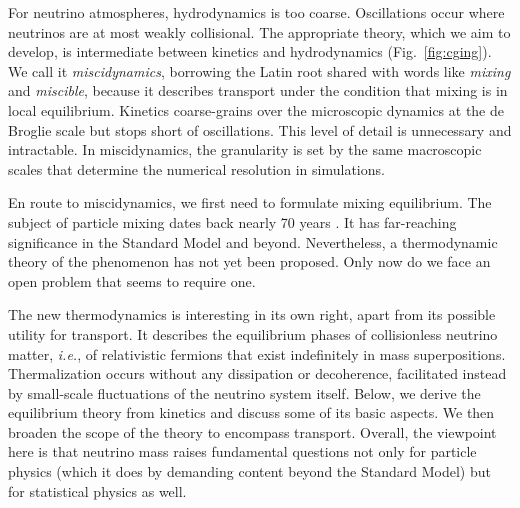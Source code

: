 \documentclass[aps,prl,twocolumn,groupedaddress]{revtex4-2}
\begin{document}
For neutrino atmospheres, hydrodynamics is too coarse. Oscillations occur where neutrinos are at most weakly collisional. The appropriate theory, which we aim to develop, is intermediate between kinetics and hydrodynamics (Fig.~\ref{fig:cging}). We call it \textit{miscidynamics}, borrowing the Latin root shared with words like \textit{mixing} and \textit{miscible}, because it describes transport under the condition that mixing is in local equilibrium. Kinetics coarse-grains over the microscopic dynamics at the de Broglie scale but stops short of oscillations. This level of detail is unnecessary and intractable. In miscidynamics, the granularity is set by the same macroscopic scales that determine the numerical resolution in simulations.

En route to miscidynamics, we first need to formulate mixing equilibrium. The subject of particle mixing dates back nearly 70 years \cite{gellmann1955, pontecorvo1957, feinberg1961}. It has far-reaching significance in the Standard Model and beyond. Nevertheless, a thermodynamic theory of the phenomenon has not yet been proposed. Only now do we face an open problem that seems to require one.

The new thermodynamics is interesting in its own right, apart from its possible utility for transport. It describes the equilibrium phases of collisionless neutrino matter, \textit{i.e.}, of relativistic fermions that exist indefinitely in mass superpositions. Thermalization occurs without any dissipation or decoherence, facilitated instead by small-scale fluctuations of the neutrino system itself. Below, we derive the equilibrium theory from kinetics and discuss some of its basic aspects. We then broaden the scope of the theory to encompass transport. Overall, the viewpoint here is that neutrino mass raises fundamental questions not only for particle physics (which it does by demanding content beyond the Standard Model) but for statistical physics as well.
\end{document}
